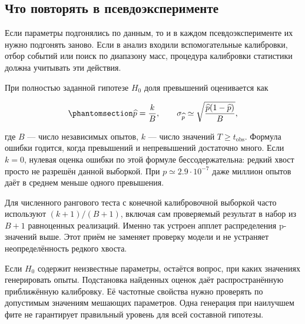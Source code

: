 \documentclass[
  russian,
  11pt,
  a4paper,
  open=any]{scrbook}
\begin{document}
\subsection{Что повторять в
псевдоэксперименте}\label{ux447ux442ux43e-ux43fux43eux432ux442ux43eux440ux44fux442ux44c-ux432-ux43fux441ux435ux432ux434ux43eux44dux43aux441ux43fux435ux440ux438ux43cux435ux43dux442ux435}

Если параметры подгонялись по данным, то и в каждом псевдоэксперименте
их нужно подгонять заново. Если в анализ входили вспомогательные
калибровки, отбор событий или поиск по диапазону масс, процедура
калибровки статистики должна учитывать эти действия.

При полностью заданной гипотезе \(H_0\) доля превышений оценивается как

\begin{equation}\protect\phantomsection\label{eq-ch13-monte-carlo-p-value}{
\widehat p=\frac{k}{B},
\qquad
\sigma_{\widehat p}\simeq
\sqrt{\frac{\widehat p(1-\widehat p)}{B}},
}\end{equation}

где \(B\) --- число независимых опытов, \(k\) --- число значений
\(T\ge t_{\mathrm{obs}}\). Формула ошибки годится, когда превышений и
непревышений достаточно много. Если \(k=0\), нулевая оценка ошибки по
этой формуле бессодержательна: редкий хвост просто не разрешён данной
выборкой. При \(p\simeq2.9\cdot10^{-7}\) даже миллион опытов даёт в
среднем меньше одного превышения.

Для численного рангового теста с конечной калибровочной выборкой часто
используют \((k+1)/(B+1)\), включая сам проверяемый результат в набор из
\(B+1\) равноценных реализаций. Именно так устроен апплет распределения
p-значений выше. Этот приём не заменяет проверку модели и не устраняет
неопределённость редкого хвоста.

Если \(H_0\) содержит неизвестные параметры, остаётся вопрос, при каких
значениях генерировать опыты. Подстановка найденных оценок даёт
распространённую приближённую калибровку. Её частотные свойства нужно
проверять по допустимым значениям мешающих параметров. Одна генерация
при наилучшем фите не гарантирует правильный уровень для всей составной
гипотезы.
\end{document}
